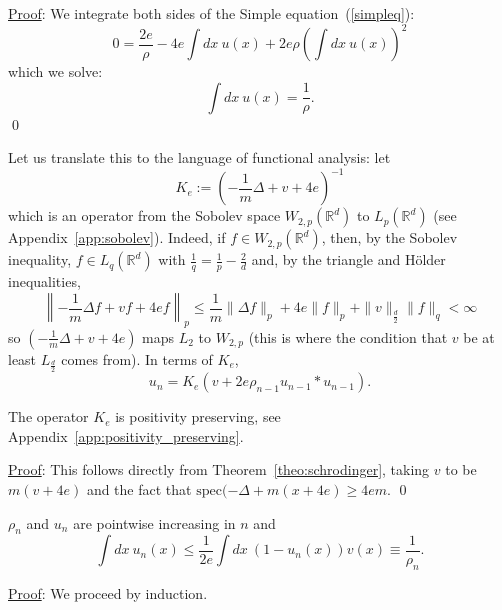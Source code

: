\documentclass{ian}
\begin{document}
\indent\underline{Proof}:
  We integrate both sides of the Simple equation\-~(\ref{simpleq}):
  \begin{equation}
    0=\frac{2e}\rho-4e\int dx\ u(x)+2e\rho\left(\int dx\ u(x)\right)^2
  \end{equation}
  which we solve:
  \begin{equation}
    \int dx\ u(x)=\frac1\rho
    .
  \end{equation}
\qed
\bigskip

\indent
Let us translate this to the language of functional analysis: let
\begin{equation}
  K_e:=\left(-\frac1m\Delta+v+4e\right)^{-1}
\end{equation}
which is an operator from the Sobolev space $W_{2,p}(\mathbb R^d)$ to $L_p(\mathbb R^d)$ (see Appendix\-~\ref{app:sobolev}).
Indeed, if $f\in W_{2,p}(\mathbb R^d)$, then, by the Sobolev inequality, $f\in L_q(\mathbb R^d)$ with $\frac1q=\frac1p-\frac 2d$ and, by the triangle and H\"older inequalities,
\begin{equation}
  \left\|-\frac1m\Delta f+vf+4ef\right\|_p
  \leqslant
  \frac1m\|\Delta f\|_p+4e\|f\|_p+\|v\|_{\frac d2}\|f\|_q
  <\infty
\end{equation}
so $(-\frac1m\Delta+v+4e)$ maps $L_2$ to $W_{2,p}$ (this is where the condition that $v$ be at least $L_{\frac d2}$ comes from).
In terms of $K_e$,
\begin{equation}
  u_n=K_e(v+2e\rho_{n-1}u_{n-1}\ast u_{n-1})
  .
\end{equation}
\bigskip

\label{lemma:Ke_pos}
  The operator $K_e$ is positivity preserving, see Appendix\-~\ref{app:positivity_preserving}.
\endtheo
\bigskip

\indent\underline{Proof}:
  This follows directly from Theorem\-~\ref{theo:schrodinger}, taking $v$ to be $m(v+4e)$ and the fact that $\mathrm{spec}(-\Delta+m(x+4e)\geqslant 4em$.
\qed
\bigskip

\label{lemma:monotone}
  $\rho_n$ and $u_n$ are pointwise increasing in $n$ and
  \nopagebreakaftereq
  \begin{equation}
    \int dx\ u_n(x)\leqslant\frac1{2e}\int dx\ (1-u_n(x))v(x)\equiv\frac1{\rho_n}
    .
  \end{equation}
\endtheo
\restorepagebreakaftereq
\bigskip

\indent\underline{Proof}:
  We proceed by induction.
  \bigskip
\end{document}
